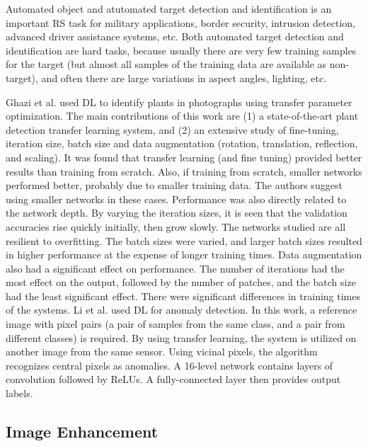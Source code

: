 \documentclass[12pt]{spieman}
\begin{document}
\begin{spacing}{1}
Automated object and atutomated target detection and identification is an important RS task for military applications, border security, intrusion detection, advanced driver assistance systems, etc. Both automated target detection and identification are hard tasks, because usually there are very few training samples for the target (but almost all samples of the training data are available as non-target), and often there are large variations in aspect angles, lighting, etc.

Ghazi et al. \cite{ghazi2017plant} used DL to identify plants in photographs using transfer parameter optimization. The main contributions of this work are (1) a state-of-the-art plant detection transfer learning system, and (2) an extensive study of fine-tuning, iteration size, batch size and data augmentation (rotation, translation, reflection, and scaling). It was found that transfer learning (and fine tuning) provided better results than training from scratch. Also, if training from scratch, smaller networks performed better, probably due to smaller training data. The authors suggest using smaller networks in these cases. Performance was also directly related to the network depth. By varying the iteration sizes, it is seen that the validation accuracies rise quickly initially, then grow slowly. The networks studied are all resilient to overfitting. The batch sizes were varied, and larger batch sizes resulted in higher performance at the expense of longer training times. Data augmentation also had a significant effect on performance. The number of iterations had the most effect on the output, followed by the number of patches, and the batch size had the least significant effect. There were significant differences in training times of the systems. Li et al. \cite{Li2017Anomaly} used DL for anomaly detection. In this work, a reference image with pixel pairs (a pair of samples from the same class, and a pair from different classes) is required. By using transfer learning, the system is utilized on another image from the same sensor. Using vicinal pixels, the algorithm recognizes central pixels as anomalies. A 16-level network contains layers of convolution followed by ReLUs. A fully-connected layer then provides output labels.

\subsection{Image Enhancement}


\end{spacing}
\end{document}
